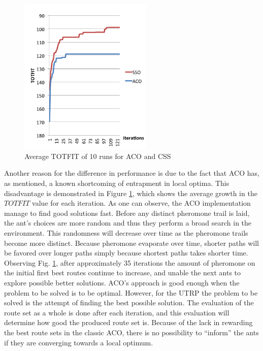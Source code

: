  \begin{figure}[H]
    \begin{center}
    \includegraphics[width=2.5in]{assets/acovsssoNEW.png}
    \end{center}
    \caption{Average TOTFIT of 10 runs for ACO and CSS}
    \label{fig:acovssso} 
\end{figure}

Another reason for the difference in performance is due to the fact that ACO has, as mentioned, a known shortcoming of entrapment in local optima. This disadvantage is demonstrated in Figure \ref{fig:acovssso}, which shows the average growth in the $TOTFIT$ value for each iteration. As one can observe, the ACO implementation manage to find good solutions fast. Before any distinct pheromone trail is laid, the ant's choices are more random and thus they perform a broad search in the environment. This randomness will decrease over time as the pheromone trails become more distinct. Because pheromone evaporate over time, shorter paths will be favored over longer paths simply because shortest paths takes shorter time. Observing Fig. \ref{fig:acovssso}, after approximately 35 iterations the amount of pheromone on the initial first best routes continue to increase, and unable the next ants to explore possible better solutions. ACO's approach is good enough when the problem to be solved is to be optimal. However, for the UTRP the problem to be solved is the attempt of finding the best possible solution. The evaluation of the route set as a whole is done after each iteration, and this evaluation will determine how good the produced route set is. Because of the lack in rewarding the best route sets in the classic ACO, there is no possibility to ``inform'' the ants if they are converging towards a local optimum.

